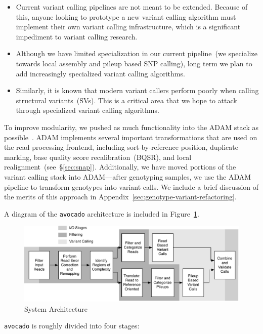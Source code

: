 \documentclass{acm_proc_article-sp}
\begin{document}
\begin{itemize}
\item Current variant calling pipelines are not meant to be extended. Because of this, anyone looking to prototype a new variant calling
algorithm must implement their own variant calling infrastructure, which is a significant impediment to variant calling research.
\item Although we have limited specialization in our current pipeline~(we specialize towards local assembly and pileup based SNP
calling), long term we plan to add increasingly specialized variant calling algorithms.
\item Similarly, it is known that modern variant callers perform poorly when calling structural variants~(SVs). This is a critical area that we
hope to attack through specialized variant calling algorithms.
\end{itemize}

To improve modularity, we pushed as much functionality into the ADAM stack as possible~\cite{massie13}. ADAM implements several
important transformations that are used on the read processing frontend, including sort-by-reference position, duplicate marking, base
quality score recalibration~(BQSR), and local realignment~(see~\S\ref{sec:snap}). Additionally, we have moved portions of the variant
calling stack into ADAM---after genotyping samples, we use the ADAM pipeline to transform genotypes into variant calls. We include
a brief discussion of the merits of this approach in Appendix~\ref{sec:genotype-variant-refactoring}.

A diagram of the \texttt{avocado} architecture is included in Figure~\ref{fig:architecture}.

\begin{figure}[h]
\begin{center}
\includegraphics[width=0.9\linewidth]{avocado-architecture.pdf}
\end{center}
\caption{System Architecture}
\label{fig:architecture}
\end{figure}

\texttt{avocado} is roughly divided into four stages:
\end{document}
